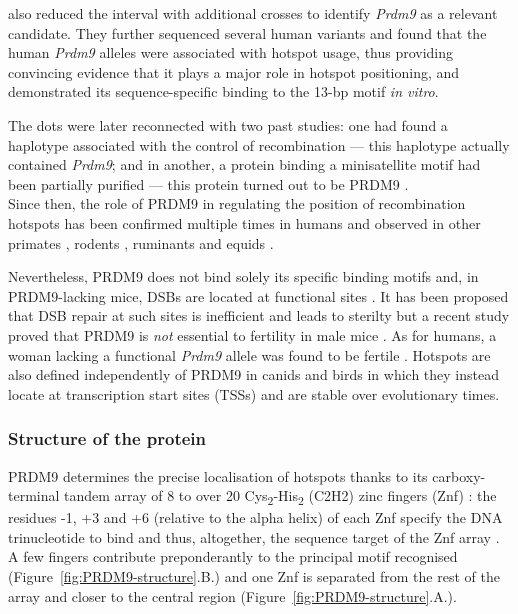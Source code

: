 \citet{baudat2010prdm9} also reduced the interval with additional crosses to identify \textit{Prdm9} as a relevant candidate. 
They further sequenced several human variants and found that the human \textit{Prdm9} alleles were associated with hotspot usage, thus providing convincing evidence that it plays a major role in hotspot positioning, and demonstrated its sequence-specific binding to the 13-bp motif \textit{in vitro}.

The dots were later reconnected with two past studies: one had found a haplotype associated with the control of recombination \citep{shiroishi1982new} — this haplotype actually contained \textit{Prdm9}; and in another, a protein binding a minisatellite motif had been partially purified \citep{wahls1991two} — this protein turned out to be PRDM9 \citep{wahls2011dna}.\\

Since then, the role of PRDM9 in regulating the position of recombination hotspots has been confirmed multiple times in humans \citep{berg2010prdm9,pratto2014recombination} and observed in other primates \citep{groeneveld2012high,heerschop2016pioneering,schwartz2014primate}, rodents \citep{buard2014diversity,capilla2014genetic,kono2014prdm9}, ruminants \citep{sandor2012genetic,ahlawat2016zinc,ahlawat2016evidence,ahlawat2017evolutionary} and equids \citep{steiner2013characterization}.

Nevertheless, PRDM9 does not bind solely its specific binding motifs \citep{grey2017vivo} and, in PRDM9-lacking mice, DSBs are located at functional sites \citep{brick2012genetic}.
It has been proposed that DSB repair at such sites is inefficient and leads to sterilty \citep{brick2012genetic} but a recent study proved that PRDM9 is \textit{not} essential to fertility in male mice \citep{mihola2019histone}. 
As for humans, a woman lacking a functional \textit{Prdm9} allele was found to be fertile \citep{narasimhan2016health}.
\pagebreak
Hotspots are also defined independently of PRDM9 in canids \citep{axelsson2012death,munoz-fuentes2011prdm9,auton2013genetic} and birds \citep{singhal2015stable} in which they instead locate at transcription start sites (TSSs) and are stable over evolutionary times.


\subsubsection{Structure of the protein}

PRDM9 determines the precise localisation of hotspots thanks to its carboxy-terminal tandem array of 8 to over 20 Cys\textsubscript{2}-His\textsubscript{2} (C2H2) zinc fingers (Znf) \citep[reviewed in][]{paigen2018prdm9}: the residues -1, +3 and +6 (relative to the alpha helix) of each Znf specify the DNA trinucleotide to bind and thus, altogether, the sequence target of the Znf array \citep{neale2010prdm9}.
A few fingers contribute preponderantly to the principal motif recognised (Figure~\ref{fig:PRDM9-structure}.B.) and one Znf is separated from the rest of the array and closer to the central region (Figure~\ref{fig:PRDM9-structure}.A.).

